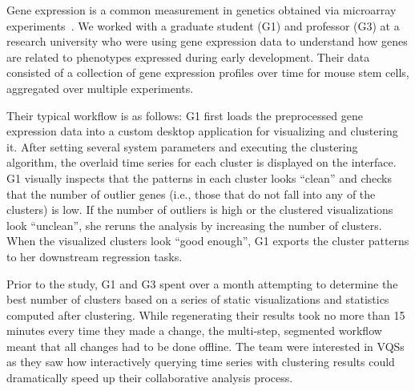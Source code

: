 \par\noindent{} Gene expression is a common measurement in genetics obtained via microarray experiments~\cite{Gloss2017}.  We worked with a graduate student (G1) and professor (G3) at a research university who were using gene expression data to understand how genes are related to phenotypes expressed during early development. Their data consisted of a collection of gene expression profiles over time for mouse stem cells, aggregated over multiple experiments. %
\par Their typical workflow is as follows: G1 first loads the preprocessed gene expression data into a custom desktop application for visualizing and clustering it. After setting several system parameters and executing the clustering algorithm, the overlaid time series for each cluster is displayed on the interface. G1 visually inspects that the patterns in each cluster looks ``clean'' and checks that the number of outlier genes (i.e., those that do not fall into any of the clusters) is low.  If the number of outliers is high or the clustered visualizations look ``unclean'', she reruns the analysis by increasing the number of clusters. When the visualized clusters look ``good enough'', G1 exports the cluster patterns to her downstream regression tasks.
\par Prior to the study, G1 and G3 spent over a month attempting to determine the best number of clusters based on a series of static visualizations and statistics computed after clustering. While regenerating their results took no more than 15 minutes every time they made a change, the multi-step, segmented workflow meant that all changes had to be done offline. The team were interested in VQSs as they saw how interactively querying time series with clustering results could dramatically speed up their collaborative analysis process.
